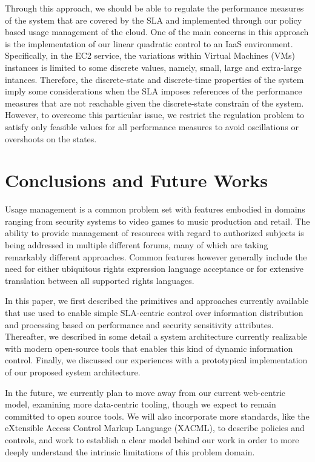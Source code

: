 \documentclass{acm_proc_article-sp}
\begin{document}
Through this approach, we should be able to regulate the performance measures of the system that are covered by the
SLA and implemented through our policy based usage management of the cloud. One of the main concerns in this approach is the
implementation of our linear quadratic control to an IaaS environment. 
Specifically, in the EC2 service, the variations within Virtual Machines (VMs) instances
is limited to some discrete values, namely, small, large and extra-large intances. Therefore, the discrete-state and
discrete-time properties of the system imply some considerations when the SLA imposes references of the 
performance measures that are not reachable given the discrete-state constrain of the system. However, to overcome 
this particular issue, we restrict the regulation problem to satisfy only feasible values for all performance measures to
avoid oscillations or overshoots on the states.

\section{Conclusions and Future Works}
Usage management is a common problem set with features embodied in domains ranging from security systems to video games to music production and retail.  The ability to provide management of resources with regard to authorized subjects is being addressed in multiple different forums, many of which are taking remarkably different approaches.  Common features however generally include the need for either ubiquitous rights expression language acceptance or for extensive translation between all supported rights languages.

In this paper, we first described the primitives and approaches currently available that use used to enable simple SLA-centric control over information distribution and processing based on performance and security sensitivity attributes.  Thereafter, we described in some detail a system architecture currently realizable with modern open-source tools that enables this kind of dynamic information control.  Finally, we discussed our experiences with a prototypical implementation of our proposed system architecture.

In the future, we currently plan to move away from our current web-centric model, examining more data-centric tooling, though we expect to remain committed to open source tools.  We will also incorporate more standards, like the eXtensible Access Control Markup Language (XACML), to describe policies and controls, and work to establish a clear model behind our work in order to more deeply understand the intrinsic limitations of this problem domain.



\end{document}
